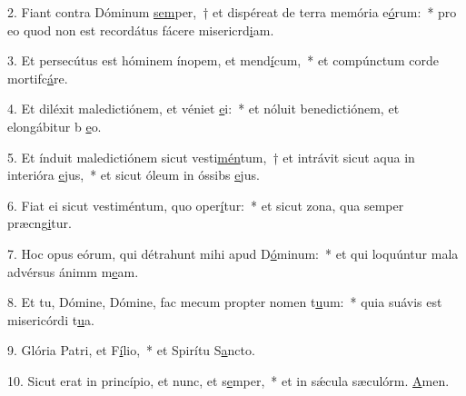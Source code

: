 2. Fiant contra Dóminum \uline{sem}per,~† et dispéreat de terra memória e\uline{ó}rum:~* pro eo quod non est recordátus fácere misericrd\uline{i}am.\par 
3. Et persecútus est hóminem ínopem, et mend\uline{í}cum,~* et compúnctum corde mortifc\uline{á}re.\par 
4. Et diléxit maledictiónem, et véniet \uline{e}i:~* et nóluit benedictiónem, et elongábitur b \uline{e}o.\par 
5. Et índuit maledictiónem sicut vesti\uline{mén}tum,~† et intrávit sicut aqua in interióra \uline{e}jus,~* et sicut óleum in óssibs \uline{e}jus.\par 
6. Fiat ei sicut vestiméntum, quo oper\uline{í}tur:~* et sicut zona, qua semper præcng\uline{i}tur.\par 
7. Hoc opus eórum, qui détrahunt mihi apud D\uline{ó}minum:~* et qui loquúntur mala advérsus ánimm m\uline{e}am.\par 
8. Et tu, Dómine, Dómine, fac mecum propter nomen t\uline{u}um:~* quia suávis est misericórdi t\uline{u}a.\par 
9. Glória Patri, et F\uline{í}lio,~* et Spirítu S\uline{a}ncto.\par 
10. Sicut erat in princípio, et nunc, et s\uline{e}mper,~* et in sǽcula sæculórm. \uline{A}men.\par 
